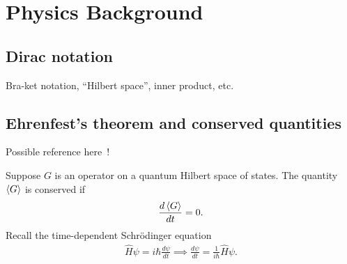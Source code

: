 \chapter{Physics Background}\label{ch:physics_background}

\section{Dirac notation}
Bra-ket notation, ``Hilbert space'', inner product, etc.

\section{Ehrenfest's theorem and conserved quantities}\label{sec:conserved_quantities}


    Possible reference here~\cite{Hall2013}!
    
    Suppose $G$ is an operator on a quantum Hilbert space of states. The quantity $\braket{G}$ is conserved if
    \begin{align*}
        \frac{d\braket{G}}{dt} = 0.
    \end{align*}
    Recall the time-dependent Schr\"odinger equation
    \begin{align*}
        \hat{H}\psi = i\hbar\frac{d\psi}{dt} \implies \frac{d\psi}{dt} = \frac{1}{i\hbar}\hat{H}\psi.
    \end{align*}

